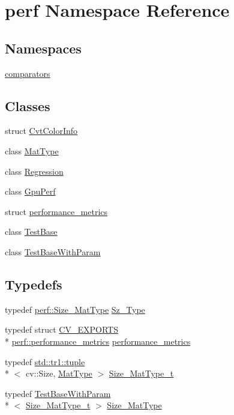 \hypertarget{namespaceperf}{\section{perf Namespace Reference}
\label{namespaceperf}
}
\subsection*{Namespaces}
\begin{DoxyCompactItemize}
\item 
\hyperlink{namespaceperf_1_1comparators}{comparators}
\end{DoxyCompactItemize}
\subsection*{Classes}
\begin{DoxyCompactItemize}
\item 
struct \hyperlink{structperf_1_1CvtColorInfo}{Cvt\-Color\-Info}
\item 
class \hyperlink{classperf_1_1MatType}{Mat\-Type}
\item 
class \hyperlink{classperf_1_1Regression}{Regression}
\item 
class \hyperlink{classperf_1_1GpuPerf}{Gpu\-Perf}
\item 
struct \hyperlink{structperf_1_1performance__metrics}{performance\-\_\-metrics}
\item 
class \hyperlink{classperf_1_1TestBase}{Test\-Base}
\item 
class \hyperlink{classperf_1_1TestBaseWithParam}{Test\-Base\-With\-Param}
\end{DoxyCompactItemize}
\subsection*{Typedefs}
\begin{DoxyCompactItemize}
\item 
typedef \hyperlink{namespaceperf_a5592072ff8cfeb1c5501095c7d4b2059}{perf\-::\-Size\-\_\-\-Mat\-Type} \hyperlink{namespaceperf_ab354e59e542bcbd03202ffce12f238d2}{Sz\-\_\-\-Type}
\item 
typedef struct \hyperlink{core_2types__c_8h_a1bf9f0e121b54272da02379cfccd0a2b}{C\-V\-\_\-\-E\-X\-P\-O\-R\-T\-S} \\*
\hyperlink{structperf_1_1performance__metrics}{perf\-::performance\-\_\-metrics} \hyperlink{namespaceperf_a822f7e10ad2c9baf40c200904e0b65b5}{performance\-\_\-metrics}
\item 
typedef \hyperlink{classstd_1_1tr1_1_1tuple}{std\-::tr1\-::tuple}\\*
$<$ cv\-::\-Size, \hyperlink{classperf_1_1MatType}{Mat\-Type} $>$ \hyperlink{namespaceperf_ac1950eaa74f7a24dcfb4fe4f6fbc6cc9}{Size\-\_\-\-Mat\-Type\-\_\-t}
\item 
typedef \hyperlink{classperf_1_1TestBaseWithParam}{Test\-Base\-With\-Param}\\*
$<$ \hyperlink{namespaceperf_ac1950eaa74f7a24dcfb4fe4f6fbc6cc9}{Size\-\_\-\-Mat\-Type\-\_\-t} $>$ \hyperlink{namespaceperf_a5592072ff8cfeb1c5501095c7d4b2059}{Size\-\_\-\-Mat\-Type}
\end{DoxyCompactItemize}
